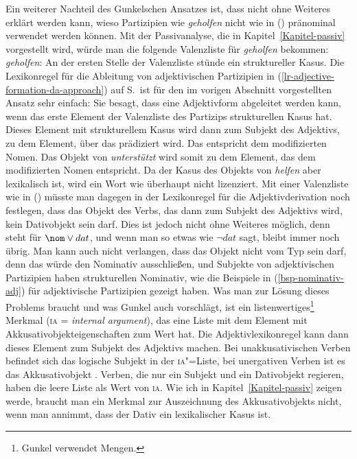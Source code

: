 Ein weiterer Nachteil des Gunkelschen Ansatzes ist, dass nicht ohne Weiteres erklärt werden kann,
wieso Partizipien wie \emph{geholfen} nicht wie in () pränominal verwendet werden können.
\z
Mit der Passivanalyse, die in Kapitel~\ref{Kapitel-passiv} vorgestellt wird, würde man die
folgende Valenzliste für \emph{geholfen} bekommen:
\ea
\emph{geholfen}: 
\z
An der ersten Stelle der Valenzliste stünde ein struktureller Kasus. Die Lexikonregel für die
Ableitung von adjektivischen Partizipien in (\ref{lr-adjective-formation-da-approach}) 
auf S.\,\pageref{lr-adjective-formation-da-approach} ist für den im vorigen Abschnitt vorgestellten
Ansatz sehr einfach: Sie besagt, dass eine Adjektivform abgeleitet werden kann, wenn das
erste Element der Valenzliste des Partizips strukturellen Kasus hat. Dieses Element mit strukturellem
Kasus wird dann zum Subjekt des Adjektivs, \dash zu dem Element, über das prädiziert wird.
Das entspricht dem modifizierten Nomen. Das Objekt von \emph{unterstützt} wird somit zu dem
Element, das dem modifizierten Nomen entspricht. Da der Kasus des Objekts von \emph{helfen}
aber lexikalisch ist, wird ein Wort wie  überhaupt nicht lizenziert. Mit einer
Valenzliste wie in () müsste man dagegen in der Lexikonregel für die Adjektivderivation
noch festlegen, dass das Objekt des Verbs, das dann zum Subjekt des Adjektivs wird,
kein Dativobjekt sein darf. Dies ist jedoch nicht ohne Weiteres möglich, denn 
steht für $\nom \vee dat$, und wenn man so etwas wie $\neg dat$ sagt, bleibt immer noch 
übrig. Man kann auch nicht verlangen, dass das Objekt nicht vom Typ  sein darf, denn
das würde den Nominativ ausschließen, und Subjekte von adjektivischen Partizipien haben strukturellen Nominativ,
wie die Beispiele in (\ref{bsp-nominativ-adj}) für adjektivische Partizipien gezeigt haben.
Was man zur Lösung dieses Problems braucht und was Gunkel auch vorschlägt, ist ein listenwertiges\footnote{
  Gunkel verwendet Mengen.%
}
Merkmal (\textsc{ia} = \emph{internal argument}), das eine Liste mit dem Element mit Akkusativobjekteigenschaften zum Wert hat. Die
Adjektivlexikonregel kann dann dieses Element zum Subjekt des Adjektivs machen. Bei unakkusativischen
Verben befindet sich das logische Subjekt in der \textsc{ia}"=Liste, bei unergativen Verben ist es das Akkusativobjekt \citep[]{Gunkel2003b}.
Verben, die nur ein Subjekt und ein Dativobjekt regieren, haben die leere Liste als Wert von \textsc{ia}.
Wie ich in Kapitel~\ref{Kapitel-passiv} zeigen werde, braucht man ein Merkmal zur Auszeichnung des
Akkusativobjekts nicht, wenn man annimmt, dass der Dativ ein lexikalischer Kasus ist.

